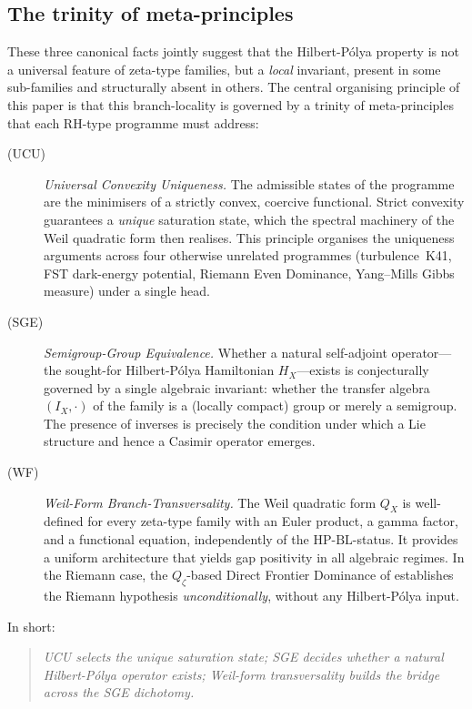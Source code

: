 \documentclass[11pt]{article}
\theoremstyle{definition}
\theoremstyle{remark}
\newcommand{\HBL}{\mathrm{HP\text{-}BL}}
\begin{document}
\subsection{The trinity of meta-principles}
\label{sec:trinity}

These three canonical facts jointly suggest that the Hilbert-P\'olya
property is not a universal feature of zeta-type families, but a
\emph{local} invariant, present in some sub-families and structurally
absent in others. The central organising principle of this paper is
that this branch-locality is governed by a trinity of meta-principles
that each RH-type programme must address:

\begin{description}
\item[(UCU)] \emph{Universal Convexity Uniqueness.} The admissible
  states of the programme are the minimisers of a strictly convex,
  coercive functional. Strict convexity guarantees a \emph{unique}
  saturation state, which the spectral machinery of the Weil quadratic
  form then realises. This principle organises the uniqueness
  arguments across four otherwise unrelated programmes
  (turbulence~K41, FST dark-energy potential, Riemann Even Dominance,
  Yang--Mills Gibbs measure) under a single head.

\item[(SGE)] \emph{Semigroup-Group Equivalence.} Whether a natural
  self-adjoint operator---the sought-for Hilbert-P\'olya Hamiltonian
  $H_X$---exists is conjecturally governed by a single algebraic
  invariant: whether the transfer algebra $(I_X, \cdot)$ of the
  family is a (locally compact) group or merely a semigroup. The
  presence of inverses is precisely the condition under which a Lie
  structure and hence a Casimir operator emerges.

\item[(WF)] \emph{Weil-Form Branch-Transversality.} The Weil
  quadratic form $Q_X$ is well-defined for every zeta-type family
  with an Euler product, a gamma factor, and a functional equation,
  independently of the $\HBL$-status. It provides a uniform
  architecture that yields gap positivity in all algebraic regimes.
  In the Riemann case, the $Q_\zeta$-based Direct Frontier Dominance
  of \cite{Geiger2026RHII} establishes the Riemann hypothesis
  \emph{unconditionally}, without any Hilbert-P\'olya input.
\end{description}

In short:

\begin{quote}
\emph{UCU selects the unique saturation state; SGE decides whether
a natural Hilbert-P\'olya operator exists; Weil-form transversality
builds the bridge across the SGE dichotomy.}
\end{quote}
\end{document}
